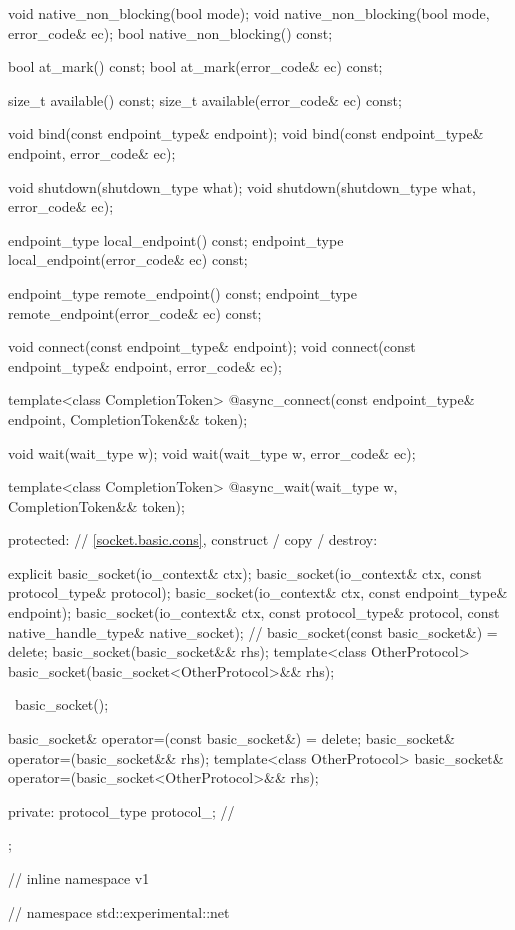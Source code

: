 \begin{codeblock}
{{{    void native_non_blocking(bool mode);
    void native_non_blocking(bool mode, error_code& ec);
    bool native_non_blocking() const;

    bool at_mark() const;
    bool at_mark(error_code& ec) const;

    size_t available() const;
    size_t available(error_code& ec) const;

    void bind(const endpoint_type& endpoint);
    void bind(const endpoint_type& endpoint, error_code& ec);

    void shutdown(shutdown_type what);
    void shutdown(shutdown_type what, error_code& ec);

    endpoint_type local_endpoint() const;
    endpoint_type local_endpoint(error_code& ec) const;

    endpoint_type remote_endpoint() const;
    endpoint_type remote_endpoint(error_code& ec) const;

    void connect(const endpoint_type& endpoint);
    void connect(const endpoint_type& endpoint, error_code& ec);

    template<class CompletionToken>
      @\DEDUCED@ async_connect(const endpoint_type& endpoint,
                            CompletionToken&& token);

    void wait(wait_type w);
    void wait(wait_type w, error_code& ec);

    template<class CompletionToken>
      @\DEDUCED@ async_wait(wait_type w, CompletionToken&& token);

  protected:
    // \ref{socket.basic.cons}, construct / copy / destroy:

    explicit basic_socket(io_context& ctx);
    basic_socket(io_context& ctx, const protocol_type& protocol);
    basic_socket(io_context& ctx, const endpoint_type& endpoint);
    basic_socket(io_context& ctx, const protocol_type& protocol,
                 const native_handle_type& native_socket); // \nativeref
    basic_socket(const basic_socket&) = delete;
    basic_socket(basic_socket&& rhs);
    template<class OtherProtocol>
      basic_socket(basic_socket<OtherProtocol>&& rhs);

    ~basic_socket();

    basic_socket& operator=(const basic_socket&) = delete;
    basic_socket& operator=(basic_socket&& rhs);
    template<class OtherProtocol>
      basic_socket& operator=(basic_socket<OtherProtocol>&& rhs);

  private:
    protocol_type protocol_; // \expos
  };

} // inline namespace v1
} // namespace std::experimental::net
\end{codeblock}

